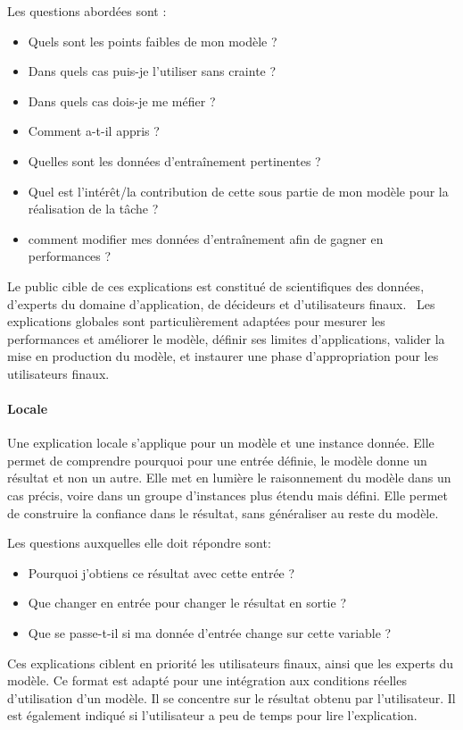 Les questions abordées sont :
\begin{itemize}
    \item Quels sont les points faibles de mon modèle ?
    \item Dans quels cas puis-je l'utiliser sans crainte ?
    \item Dans quels cas dois-je me méfier ?
    \item Comment a-t-il appris ?
    \item Quelles sont les données d'entraînement pertinentes ?
    \item Quel est l'intérêt/la contribution de cette sous partie de mon modèle pour la réalisation de la tâche ?
    \item comment modifier mes données d'entraînement afin de gagner en performances ?
\end{itemize}

Le public cible de ces explications est constitué de scientifiques des données, d'experts du domaine d'application, de décideurs et d'utilisateurs finaux.~\cite{Mitchell2019}
Les explications globales sont particulièrement adaptées pour mesurer les performances et améliorer le modèle, définir ses limites d'applications, valider la mise en production du modèle, et instaurer une phase d'appropriation pour les utilisateurs finaux.

\paragraph{Locale}
Une explication locale s'applique pour un modèle et une instance donnée. Elle permet de comprendre pourquoi pour une entrée définie, le modèle donne un résultat et non un autre.
Elle met en lumière le raisonnement du modèle dans un cas précis, voire dans un groupe d'instances plus étendu mais défini. Elle permet de construire la confiance dans le résultat, sans généraliser au reste du modèle.

Les questions auxquelles elle doit répondre sont:
\begin{itemize}
    \item Pourquoi j'obtiens ce résultat avec cette entrée ?
    \item Que changer en entrée pour changer le résultat en sortie ?
    \item Que se passe-t-il si ma donnée d'entrée change sur cette variable ?
\end{itemize}
Ces explications ciblent en priorité les utilisateurs finaux, ainsi que les experts du modèle.
Ce format est adapté pour une intégration aux conditions réelles d'utilisation d'un modèle. Il se concentre sur le résultat obtenu par l'utilisateur. Il est également indiqué si l'utilisateur a peu de temps pour lire l'explication.

